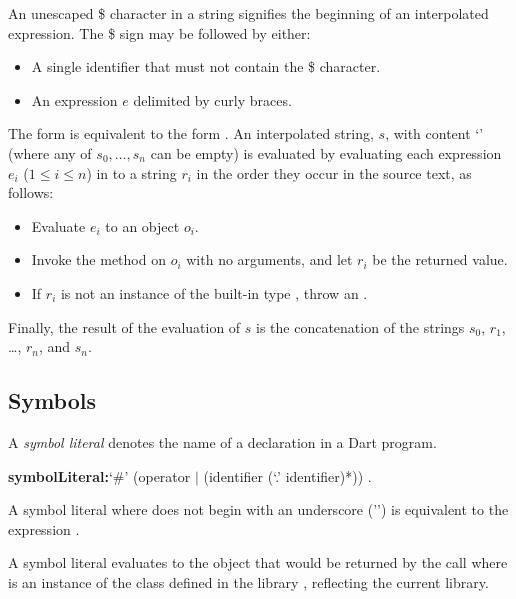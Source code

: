 \documentclass{article}
\begin{document}

\LMHash{}
An unescaped \$ character in a string signifies the beginning of an interpolated expression.
The \$ sign may be followed by either:
\begin{itemize}
\item A single identifier \id{} that must not contain the \$ character.
\item An expression $e$ delimited by curly braces.
\end{itemize}

\LMHash{}
The form  is equivalent to the form .
An interpolated string, $s$, with content `' (where any of $s_0, \ldots, s_n$ can be empty)
is evaluated by evaluating each expression $e_i$ ($1 \le i \le n$) in to a string $r_i$ in the order they occur in the source text, as follows:
\begin{itemize}
\item{} Evaluate $e_i$ to an object $o_i$.
\item{} Invoke the  method on $o_i$ with no arguments, and let
 $r_i$ be the returned value.
\item{} If $r_i$ is not an instance of the built-in type , throw an .
\end{itemize}
Finally, the result of the evaluation of $s$ is the concatenation of the strings $s_0$, $r_1$, \ldots, $r_n$, and $s_n$.


\subsection{Symbols}

\LMHash{}
A {\em symbol literal} denotes the name of a declaration in a Dart program.

\begin{grammar}
{\bf symbolLiteral:}`\#' (operator $|$ (identifier (`{\escapegrammar .}' identifier)*))
  .
\end{grammar}

\LMHash{}
A symbol literal \code{\#\id} where \id{} does not begin with an underscore ('\code{\_}') is equivalent to the expression .

\LMHash{}
A symbol literal \code{\#\_\id} evaluates to the object that would be returned by the call  where  is an instance of the class  defined in the library , reflecting the current library.
\end{document}
